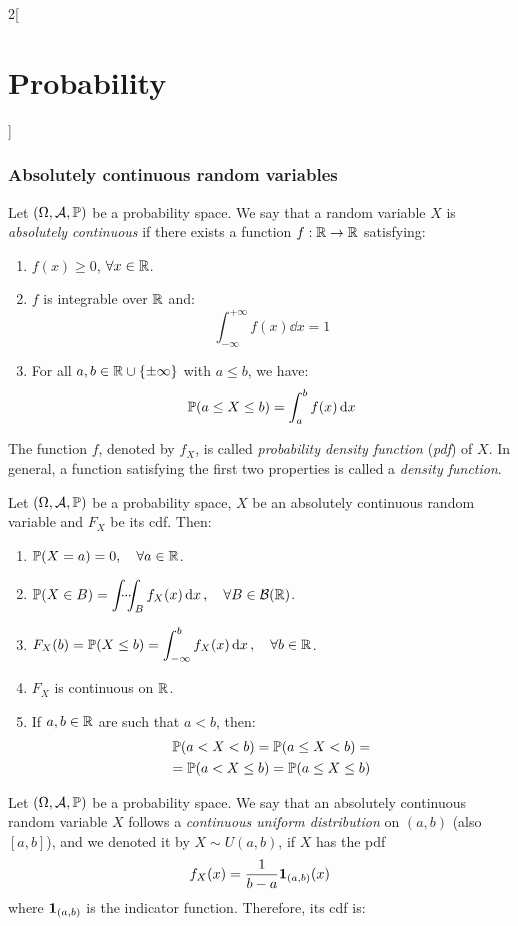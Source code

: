 \documentclass[../../../main.tex]{subfiles}
\begin{document}
\begin{multicols}{2}[\section{Probability}]
  \subsubsection{Absolutely continuous random variables}
  \begin{definition}
    Let $(\Omega,\mathcal{A},\mathbb{P})$ be a probability space. We say that a random variable $X$ is \emph{absolutely continuous} if there exists a function $f:\mathbb{R}\rightarrow\mathbb{R}$ satisfying:
    \begin{enumerate}
      \item $f(x)\geq 0$, $\forall x\in\mathbb{R}$.
      \item $f$ is integrable over $\mathbb{R}$ and: $$\int_{-\infty}^{+\infty}f(x)\dd{x}=1$$
      \item For all $a,b\in\mathbb{R}\cup\{\pm\infty\}$ with $a\leq b$, we have: $$\mathbb{P}(a\leq X\leq b)=\int_a^bf(x)\dd{x}$$
    \end{enumerate}
    The function $f$, denoted by $f_X$, is called \emph{probability density function} (\emph{pdf}) of $X$. In general, a function satisfying the first two properties is called a \emph{density function}.
  \end{definition}
  \begin{proposition}
    Let $(\Omega,\mathcal{A},\mathbb{P})$ be a probability space, $X$ be an absolutely continuous random variable and $F_X$ be its cdf. Then:
    \begin{enumerate}
      \item $\mathbb{P}(X=a)=0,\quad\forall a\in \mathbb{R}$.
      \item $\displaystyle \Prob(X\in B)=\dotsint_Bf_X(x)\dd{x},\quad\forall B\in\mathcal{B}(\RR)$.
      \item $\displaystyle F_X(b)=\mathbb{P}(X\leq b)=\int_{-\infty}^bf_X(x)\dd{x},\quad\forall b\in\mathbb{R}$.
      \item $F_X$ is continuous on $\mathbb{R}$.
      \item If $a,b\in\mathbb{R}$ are such that $a<b$, then:
            \begin{multline*}
              \mathbb{P}(a<X<b)=\mathbb{P}(a\leq X<b)=\\=\mathbb{P}(a<X\leq b)=\mathbb{P}(a\leq X\leq b)
            \end{multline*}
    \end{enumerate}
  \end{proposition}
  \begin{definition}
    Let $(\Omega,\mathcal{A},\mathbb{P})$ be a probability space. We say that an absolutely continuous random variable $X$ follows a \emph{continuous uniform distribution} on $(a,b)$ (also $[a,b]$), and we denoted it by $X\sim U(a,b)$, if $X$ has the pdf $$f_X(x)=\frac{1}{b-a}\boldsymbol{\mathrm{1}}_{(a,b)}(x)$$ where $\boldsymbol{\mathrm{1}}_{(a,b)}$ is the indicator function. Therefore, its cdf is:

\end{definition}
\end{multicols}
\end{document}
